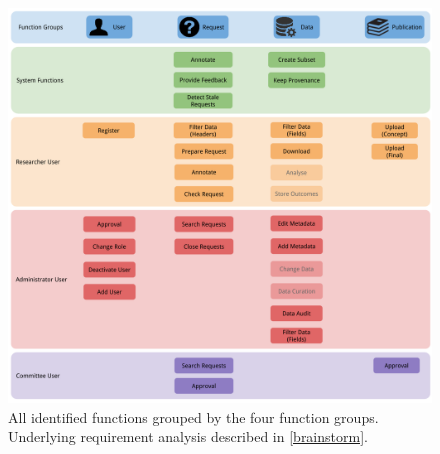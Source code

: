 \begin{figure}[hb]
	\centering
	\includegraphics[width=1.0\linewidth]{images/functions-in-groups}
	\caption{
		All identified functions grouped by the four function groups.
		Underlying requirement analysis described in \ref{brainstorm}.
	}
	\label{fig:all-functions-grouped}
\end{figure}